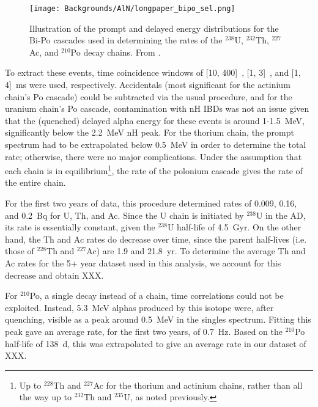 \documentclass[../thesis.tex]{subfiles}
\begin{document}
\begin{figure}[ht]
  \texttt{[image: Backgrounds/AlN/longpaper\_bipo\_sel.png]}
  \caption{Illustration of the prompt and delayed energy distributions for the Bi-Po cascades used in determining the rates of the $^{238}$U, $^{232}$Th, $^{227}$Ac, and $^{210}$Po decay chains. From \cite{An_2017}.}
  \label{fig:aln_longpaper_bipo_sel}
\end{figure}

To extract these events, time coincidence windows of [10, 400]~\us, [1, 3]~\us, and [1, 4]~ms were used, respectively. Accidentals (most significant for the actinium chain's Po cascade) could be subtracted via the usual procedure,
and for the uranium chain's Po cascade, contamination with nH IBDs was not an issue given that the (quenched) delayed alpha energy for these events is around 1-1.5~MeV, significantly below the 2.2~MeV nH peak. For the thorium chain, the prompt spectrum had to be extrapolated below 0.5~MeV in order to determine the total rate; otherwise, there were no major complications. Under the assumption that each chain is in equilibrium\footnote{Up to $^{228}$Th and $^{227}$Ac for the thorium and actinium chains, rather than all the way up to $^{232}$Th and $^{235}$U, as noted previously.}, the rate of the polonium cascade gives the rate of the entire chain.

For the first two years of data, this procedure determined rates of 0.009, 0.16, and 0.2~Bq for U, Th, and Ac. Since the U chain is initiated by $^{238}$U in the AD, its rate is essentially constant, given the $^{238}$U half-life of 4.5~Gyr. On the other hand, the Th and Ac rates do decrease over time, since the parent half-lives (i.e. those of $^{228}$Th and $^{227}$Ac) are 1.9 and 21.8~yr. To determine the average Th and Ac rates for the 5+ year dataset used in this analysis, we account for this decrease and obtain XXX.

For $^{210}$Po, a single decay instead of a chain, time correlations could not be exploited. Instead, 5.3~MeV alphas produced by this isotope were, after quenching, visible as a peak around 0.5~MeV in the singles spectrum. Fitting this peak gave an average rate, for the first two years, of 0.7~Hz. Based on the $^{210}$Po half-life of 138~d, this was extrapolated to give an average rate in our dataset of XXX.
\end{document}
